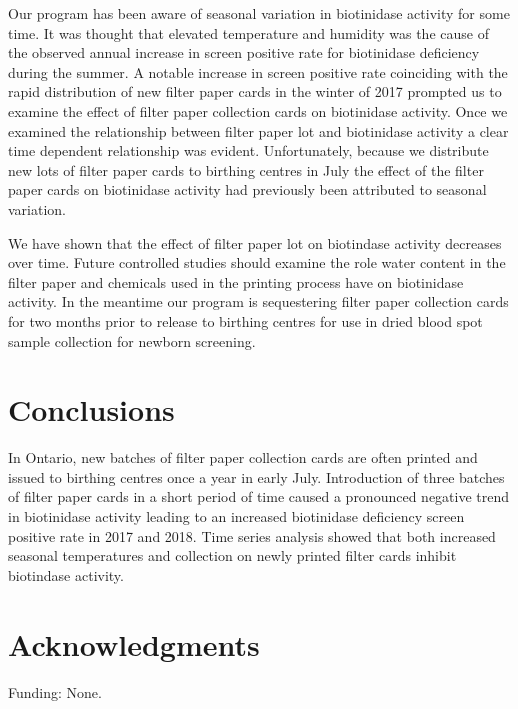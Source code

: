 \documentclass[review]{elsarticle}
\begin{document}
Our program has been aware of seasonal variation in biotinidase
activity for some time. It was thought that elevated temperature and
humidity was the cause of the observed annual increase in screen
positive rate for biotinidase deficiency during the summer. A notable
increase in screen positive rate coinciding with the rapid
distribution of new filter paper cards in the winter of 2017 prompted
us to examine the effect of filter paper collection cards on
biotinidase activity. Once we examined the relationship between filter
paper lot and biotinidase activity a clear time dependent relationship
was evident. Unfortunately, because we distribute new lots of filter
paper cards to birthing centres in July the effect of the filter paper
cards on biotinidase activity had previously been attributed to
seasonal variation.

We have shown that the effect of filter paper lot on biotindase
activity decreases over time. Future controlled studies should examine
the role water content in the filter paper and chemicals used in the
printing process have on biotinidase activity. In the meantime our
program is sequestering filter paper collection cards for two months
prior to release to birthing centres for use in dried blood spot
sample collection for newborn screening.

\section*{Conclusions}
\label{sec:org05179ec}

In Ontario, new batches of filter paper collection cards are often
printed and issued to birthing centres once a year in early
July. Introduction of three batches of filter paper cards in a short
period of time caused a pronounced negative trend in biotinidase
activity leading to an increased biotinidase deficiency screen
positive rate in 2017 and 2018. Time series analysis showed that both
increased seasonal temperatures and collection on newly printed filter
cards inhibit biotindase activity.

\section*{Acknowledgments}
\label{sec:orgeb37330}
Funding: None.
\end{document}
